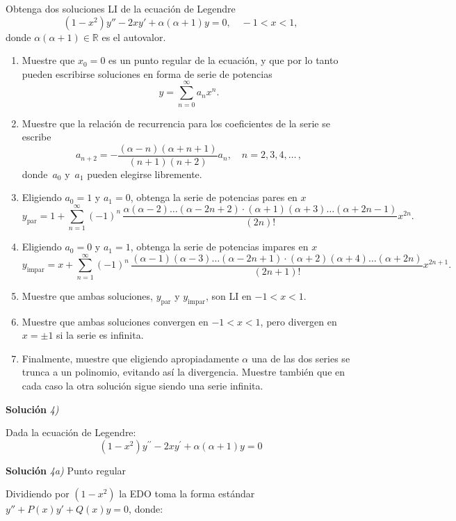 \documentclass[11pt,spanish]{article}
\newcommand{\sca}[1]{\mathbb{#1}}
\newcounter{problema}
\newcommand{\prob}{\stepcounter{problema} \vspace{.5cm} \noindent{\bf Problema \arabic{problema}: }}
\begin{document}
\prob Obtenga dos soluciones LI de la ecuación de Legendre
\[
(1-x^2)y'' - 2xy' + \alpha(\alpha+1)y = 0, \quad -1<x<1,
\]
donde $\alpha(\alpha+1)\in\sca{R}$ es el autovalor.
\begin{enumerate}
\item Muestre que $x_0=0$ es un punto regular de la ecuaci\'on, y que por lo tanto pueden escribirse soluciones en forma de serie de potencias
\[
y = \sum_{n=0}^{\infty} a_n x^{n}.
\]
\item Muestre que la relaci\'on de recurrencia para los coeficientes de la serie se escribe
\[
a_{n+2} = -\frac{(\alpha-n)(\alpha+n+1)}{(n+1)(n+2)}a_n, \quad n=2,3,4,\ldots\,,
\]
donde~$a_0$ y~$a_1$ pueden elegirse libremente.
\item Eligiendo $a_0=1$ y  $a_1=0$, obtenga la serie de potencias pares en $x$
\[
y_{\text{par}} = 1 + \sum_{n=1}^\infty
    (-1)^n\,\frac{\alpha(\alpha-2)\dots(\alpha-2n+2)\cdot 
                  (\alpha+1)(\alpha+3)\dots(\alpha+2n-1)}{(2n)!} x^{2n}.
\]
\item Eligiendo $a_0=0$ y  $a_1=1$, obtenga la serie de potencias impares en $x$
\[
y_{\text{impar}} =  x + \sum_{n=1}^\infty
    (-1)^n\,\frac{(\alpha-1)(\alpha-3)\dots(\alpha-2n+1)\cdot
                  (\alpha+2)(\alpha+4)\dots(\alpha+2n)}{(2n+1)!} x^{2n+1}.
\]
\item Muestre que ambas soluciones, $y_{\text{par}}$ y $y_{\text{impar}}$, son LI en $-1<x<1$.
\item Muestre que ambas soluciones convergen en $-1<x<1$, pero divergen en $x = \pm 1$ si la serie es infinita.
\item Finalmente, muestre que eligiendo apropiadamente $\alpha$ una de las dos series se trunca a un polinomio, evitando así la divergencia. Muestre tambi\'en que en cada caso la otra soluci\'on sigue siendo una serie infinita.
\end{enumerate}

\vspace{0.5cm}
{\bf Soluci\'on }{\em 4)}
\vspace{0.5cm}

Dada la ecuación de Legendre:
$$(1-x^{2})y^{\prime\prime}-2xy^{\prime}+\alpha(\alpha+1)y=0$$

\vspace{0.5cm}
{\bf Soluci\'on }{\em 4a)}
Punto regular
\vspace{0.5cm}

Dividiendo por $(1-x^2)$ la EDO toma la forma estándar $y'' + P(x)y' + Q(x)y = 0$, donde:
\end{document}
